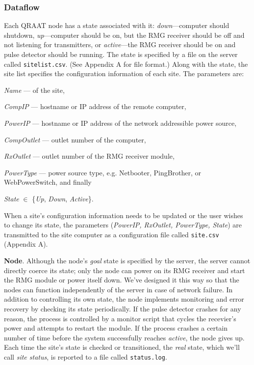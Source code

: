 \documentclass[letter]{article}
\begin{document}
\subsubsection{Dataflow}
Each QRAAT node has a state associated with it: \textit{down}---computer should shutdown,
\textit{up}---computer should be on, but the RMG receiver should be off and not listening 
for transmitters, or \textit{active}---the RMG receiver should be on and pulse detector should
be running. The state is specified by a file on the server called \texttt{sitelist.csv}.
(See Appendix A for file format.) Along with the state, the site list specifies the 
configuration information of each site. The parameters are:
\begin{description}
  \item \textit{Name} --- of the site, 
  \item \textit{CompIP} --- hostname or IP address of the remote computer, 
  \item \textit{PowerIP} --- hostname or IP address of the network addressible power source,
  \item \textit{CompOutlet} --- outlet number of the computer, 
  \item \textit{RxOutlet} --- outlet number of the RMG receiver module, 
  \item \textit{PowerType} --- power source type, e.g. Netbooter, PingBrother, or WebPowerSwitch, and finally
  \item \textit{State} $\in$ \{\textit{Up}, \textit{Down}, \textit{Active}\}.
\end{description}

When a site's configuration information needs to be updated or the user wishes to change 
its state, the parameters (\textit{PowerIP, RxOutlet, PowerType, State}) are transmitted to the
site computer as a configuration file called \texttt{site.csv} (Appendix A). 

\textbf{Node}. Although the node's \textit{goal} state is specified by the server, the server
cannot directly coerce its state; only the node can power on its RMG receiver and start the RMG
module or power itself down. We've designed it this way so that the nodes can function independently
of the server in case of network failure. In addition to controlling its own state, the node 
implements monitoring and error recovery by checking its state periodically. If the pulse detector
crashes for any reason, the process is controlled by a monitor script that cycles the recevier's 
power and attempts to restart the module. If the process crashes a certain number of time before 
the system successfully reaches \textit{active}, the node gives up. Each time the site's state is 
checked or transitioned, the \textit{real} state, which we'll call \textit{site status}, is 
reported to a file called \texttt{status.log}. 
\end{document}
